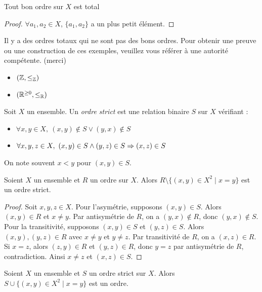 \begin{lemme}
    Tout bon ordre sur $X$ est total 
\end{lemme}
\begin{proof}
    $\forall a_1,a_2\in X$, $\{a_1,a_2\}$ a un plus petit élément.
\end{proof}
\begin{remarque}
    Il y a des ordres totaux qui ne sont pas des bons ordres. Pour obtenir une preuve ou une construction de ces exemples, veuillez vous référer à une autorité compétente. (merci)
    \begin{itemize}
        \item $(\mathbb{Z},\leq_{\mathbb{Z}})$
        \item $(\mathbb{R}^{\ge 0},\leq_{\mathbb{R}})$
    \end{itemize}
\end{remarque}
\begin{definition}
    Soit $X$ un ensemble. Un \emph{ordre strict} est une relation binaire $S$ sur $X$ vérifiant :
    \begin{itemize}
        \item $\forall x,y\in X,\ (x,y)\notin S \lor (y,x)\notin S$
        \item $\forall x,y,z\in X,\ (x,y)\in S\land (y,z)\in S\Rightarrow (x,z)\in S$
    \end{itemize}
\end{definition}
\begin{notation}
    On note souvent $x<y$ pour $(x,y)\in S$.
\end{notation}
\begin{proposition}
    Soient $X$ un ensemble et $R$ un ordre sur $X$. Alors $R\setminus\{(x,y)\in X^2\mid x=y\}$ est un ordre strict.
\end{proposition}
\begin{proof}

Soit $x, y, z \in X$.
Pour l'asymétrie, supposons $(x,y) \in S$. Alors $(x,y) \in R$ et $x \neq y$. Par antisymétrie de $R$, on a $(y,x) \notin R$, donc $(y,x) \notin S$.
Pour la transitivité, supposons $(x,y) \in S$ et $(y,z) \in S$. Alors $(x,y), (y,z) \in R$ avec $x \neq y$ et $y \neq z$. Par transitivité de $R$, on a $(x,z) \in R$. Si $x = z$, alors $(z,y) \in R$ et $(y,z) \in R$, donc $y = z$ par antisymétrie de $R$, contradiction. Ainsi $x \neq z$ et $(x,z) \in S$.
\end{proof}
\begin{proposition}
    Soient $X$ un ensemble et $S$ un ordre strict sur $X$. Alors $S\cup\{(x,y)\in X^2\mid x=y\}$ est un ordre.
\end{proposition}
